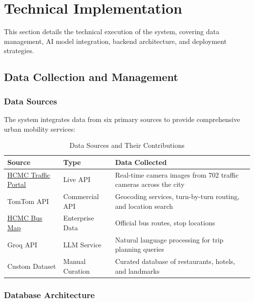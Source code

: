 \chapter{Technical Implementation}
\label{chap:technical-implementation}


This section details the technical execution of the system, covering data management, AI model integration, backend architecture, and deployment strategies.

\section{Data Collection and Management}

\subsection{Data Sources}

The system integrates data from six primary sources to provide comprehensive urban mobility services:

\begin{table}[H]
    \centering
    \renewcommand{\arraystretch}{1.3}
    \begin{tabularx}{\textwidth}{|p{3.5cm}|p{2.5cm}|X|}
        \hline
        \textbf{Source} & \textbf{Type} & \textbf{Data Collected} \\
        \hline
        \href{https://giaothong.hochiminhcity.gov.vn}{HCMC Traffic Portal} & Live API & Real-time camera images from 702 traffic cameras across the city \\
        \hline
        TomTom API & Commercial API & Geocoding services, turn-by-turn routing, and location search \\
        \hline
        \href{https://busmap.vn}{HCMC Bus Map} & Enterprise Data & Official bus routes, stop locations \\
        \hline
        Groq API & LLM Service & Natural language processing for trip planning queries \\
        \hline
        Custom Dataset & Manual Curation & Curated database of restaurants, hotels, and landmarks \\
        \hline
    \end{tabularx}
    \caption{Data Sources and Their Contributions}
    \label{tab:data-sources}
\end{table}

\subsection{Database Architecture}

